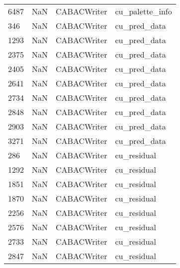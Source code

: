 \begin{tabular}{llll}
6487 &                   NaN &                CABACWriter &                           cu\_palette\_info \\
346  &                   NaN &                CABACWriter &                              cu\_pred\_data \\
1293 &                   NaN &                CABACWriter &                              cu\_pred\_data \\
2375 &                   NaN &                CABACWriter &                              cu\_pred\_data \\
2405 &                   NaN &                CABACWriter &                              cu\_pred\_data \\
2641 &                   NaN &                CABACWriter &                              cu\_pred\_data \\
2734 &                   NaN &                CABACWriter &                              cu\_pred\_data \\
2848 &                   NaN &                CABACWriter &                              cu\_pred\_data \\
2903 &                   NaN &                CABACWriter &                              cu\_pred\_data \\
3271 &                   NaN &                CABACWriter &                              cu\_pred\_data \\
286  &                   NaN &                CABACWriter &                               cu\_residual \\
1292 &                   NaN &                CABACWriter &                               cu\_residual \\
1851 &                   NaN &                CABACWriter &                               cu\_residual \\
1870 &                   NaN &                CABACWriter &                               cu\_residual \\
2256 &                   NaN &                CABACWriter &                               cu\_residual \\
2576 &                   NaN &                CABACWriter &                               cu\_residual \\
2733 &                   NaN &                CABACWriter &                               cu\_residual \\
2847 &                   NaN &                CABACWriter &                               cu\_residual \\

\end{tabular}
